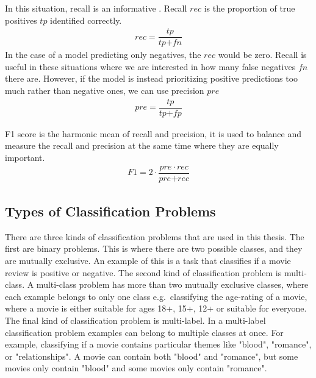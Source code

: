 In this situation,  recall is an informative . Recall $\textit{rec}$ is the proportion of true positives $\textit{tp}$ identified correctly. 
\begin{align}
\textit{rec} = \dfrac{\textit{tp}}{\textit{tp} + \textit{fn}}
\end{align}
In the case of a model predicting only negatives, the $\textit{rec}$ would be zero. Recall is useful in these situations where we are interested in how many false negatives ${fn}$ there are. However, if the model is instead prioritizing positive predictions too much rather than negative ones, we can use precision ${pre}$
\begin{align}
\textit{pre} = \dfrac{\textit{tp}} {\textit{tp} + \textit{fp}}
\end{align}

F1 score is the harmonic mean of recall and precision, it is used to balance and measure the recall and precision at the same time where they are equally important. 
\begin{align}
{F1} = 2 \cdot \dfrac{\textit{pre} \cdot {rec}}{\textit{pre} + \textit{rec}}
\end{align}

\subsection{Types of Classification Problems}\label{bg:multi-label}


There are three kinds of classification problems that are used in this thesis. The first are binary problems. This is where there are two possible classes, and they are mutually exclusive. An example of this is a task that classifies if a movie review is positive or negative. The second kind of classification problem is multi-class. A multi-class problem has more than two mutually exclusive classes, where each example belongs to only one class e.g.\ classifying the age-rating of a movie, where a movie is either suitable for ages 18+, 15+, 12+ or suitable for everyone. The final kind of classification problem is multi-label. In a multi-label classification problem examples can belong to multiple classes at once. For example, classifying if a movie contains particular themes like "blood", "romance", or "relationships". A movie can contain both "blood" and "romance", but some movies only contain "blood" and some movies only contain "romance". 

